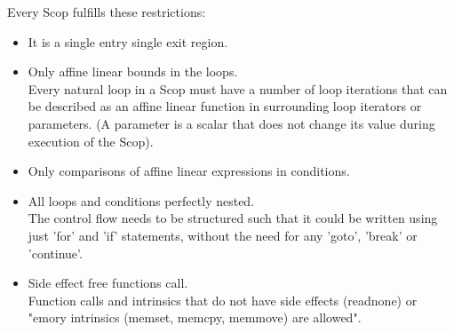 Every Scop fulfills these restrictions:
\begin{itemize}
    \item It is a single entry single exit region.
    \item Only affine linear bounds in the loops.\\
        Every natural loop in a Scop must have a number of loop iterations that can be described as an affine linear function in surrounding loop iterators or parameters. (A parameter is a scalar that does not change its value during execution of the Scop).
    \item Only comparisons of affine linear expressions in conditions.
    \item All loops and conditions perfectly nested.\\
        The control flow needs to be structured such that it could be written using just 'for' and 'if' statements, without the need for any 'goto', 'break' or 'continue'.
    \item Side effect free functions call.\\
        Function calls and intrinsics that do not have side effects (readnone) or "emory intrinsics (memset, memcpy, memmove) are allowed".
\end{itemize}
